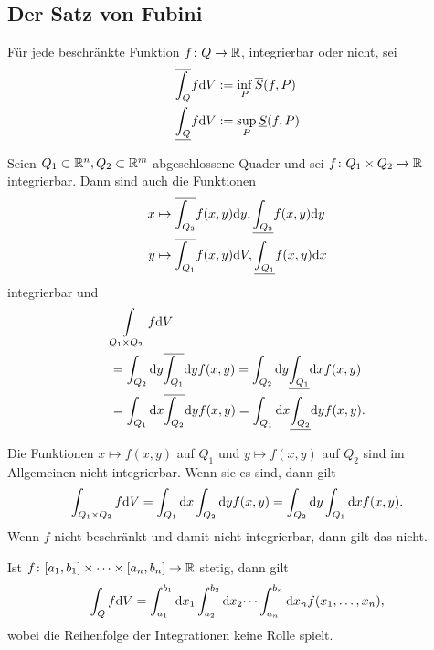 \subsection{Der Satz von Fubini}
Für jede beschränkte Funktion $f \colon Q \to \mathbb{R}$, integrierbar oder nicht, sei
\begin{align*}
	\overline{\int_Q} f \mathrm{d} V &:= \inf_P \overline{S}(f,P)\\
	\underline{\int_Q} f \mathrm{d} V &:= \sup_P \underline{S}(f,P)
\end{align*}
\begin{thm}\label{thm2_8}
	Seien $Q_1 \subset \mathbb{R}^n, Q_2 \subset \mathbb{R}^m$ abgeschlossene Quader und sei $f \colon Q_1 \times Q_2 \to \mathbb{R}$ integrierbar. Dann sind auch die Funktionen
	\begin{align*}
		x &\mapsto 	\overline{\int_{Q_2}} f(x,y) \mathrm{d} y, \underline{\int_{Q_2}} f(x,y) \mathrm{d} y\\
		y &\mapsto 	\overline{\int_{Q_1}} f(x,y) \mathrm{d} V, \underline{\int_{Q_1}} f(x,y) \mathrm{d} x\\
	\end{align*}
	integrierbar und 
	\begin{align*}
		&\int\limits_{Q_1 \times Q_2} f \mathrm{d} V \\
		&= \int_{Q_2} \mathrm{d} y \overline{\int_{Q_1}} \mathrm{d} y f(x,y) = \int_{Q_2} \mathrm{d} y \underline{\int_{Q_1}} \mathrm{d} x f(x,y)\\
		&= \int_{Q_1} \mathrm{d} x \overline{\int_{Q_2}} \mathrm{d} y f(x,y) = \int_{Q_1} \mathrm{d} x \underline{\int_{Q_2}} \mathrm{d} y f(x,y).
	\end{align*}
\end{thm}
\begin{rem}
	Die Funktionen $x \mapsto f(x,y)$ auf $Q_1$ und $y \mapsto f(x,y)$ auf $Q_2$ sind im Allgemeinen nicht integrierbar. Wenn sie es sind, dann gilt
	\[\int_{Q_1 \times Q_2} f \mathrm{d} V = \int_{Q_1} \mathrm{d} x \int_{Q_2} \mathrm{d} y f(x,y) = \int_{Q_2} \mathrm{d} y \int_{Q_1} \mathrm{d} x f(x,y).\]
	Wenn $f$ nicht beschränkt und damit nicht integrierbar, dann gilt das nicht.
\end{rem}
\begin{kor}\label{kor2_9}
	Ist $f \colon [a_1,b_1] \times \dots \times [a_n, b_n] \to \mathbb{R}$ stetig, dann gilt
	\[\int_Q f \mathrm{d} V = \int_{a_1}^{b_1} \mathrm{d} x_1 \int_{a_2}^{b_2} \mathrm{d} x_2 \dots \int_{a_n}^{b_n} \mathrm{d} x_n f(x_1, \dots, x_n),\]
	wobei die Reihenfolge der Integrationen keine Rolle spielt.
\end{kor}
